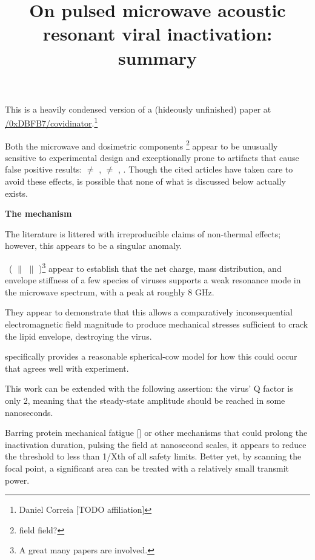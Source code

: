 \documentclass[fleqn,10pt]{paper}
\title{On pulsed microwave acoustic resonant viral inactivation: summary}
\begin{document}
\maketitle


This is a heavily condensed version of a (hideously unfinished) paper at \href{https://www.github.com/0xDBFB7/covidinator/documents/paper.pdf}{\faGithub/0xDBFB7/covidinator}.\footnote{Daniel Correia [TODO affiliation] }

Both the microwave and dosimetric components \footnote{field field?} appear to be unusually sensitive to experimental design and exceptionally prone to artifacts that cause false positive results: \cite{Microwave1982} $\neq$ \cite{Resonances1987}, \cite{Effects1985a} $\neq$ \cite{Cytogenetic1986}, \cite{Comprehensive2018}. Though the cited articles have taken care to avoid these effects, is possible that none of what is discussed below actually exists.  

{\Large \textbf{The mechanism}}

The literature is littered with irreproducible claims of non-thermal effects; however, this appears to be a singular anomaly.

\cite{Microwave2009} \textrightarrow \ (\cite{focusing2014} $\parallel$ \cite{Efficient2015} $\parallel$ \cite{Resonant2017})\footnote{A great many papers are involved.} appear to establish that the net charge, mass distribution, and envelope stiffness of a few species of viruses supports a weak resonance mode in the microwave spectrum, with a peak at roughly 8 GHz.

They appear to demonstrate that this allows a comparatively inconsequential electromagnetic field magnitude to produce mechanical stresses sufficient to crack the lipid envelope, destroying the virus.

\cite{Efficient2015} specifically provides a reasonable spherical-cow model for how this could occur that agrees well with experiment.

This work can be extended with the following assertion: the virus' Q factor is only 2, meaning that the steady-state amplitude should be reached in some nanoseconds. 

Barring protein mechanical fatigue [] or other mechanisms that could prolong the inactivation duration, pulsing the field at nanosecond scales, it appears to reduce the threshold to less than 1/Xth of all safety limits. Better yet, by scanning the focal point, a significant area can be treated with a relatively small transmit power.
\end{document}

